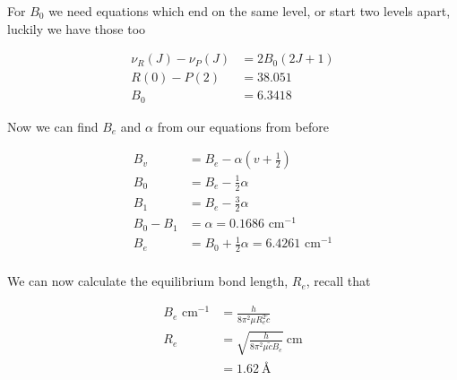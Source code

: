 \documentclass{article}
\newcommand{\mcm}{\text{ cm}^{-1}}
\begin{document}
    For $B_0$ we need equations which end on the same level, or start two levels apart, luckily we have those too

    \begin{align*}
        \nu_R(J) - \nu_P(J) &= 2B_0(2J+1)\\
        R(0)-P(2) &= 38.051\\
        B_0 &= 6.3418
    \end{align*}

    Now we can find $B_e$ and $\alpha$ from our equations from before

    \begin{align*}
        B_v &= B_e - \alpha\left(v+\frac{1}{2}\right)\\
        B_0 &= B_e - \frac{1}{2} \alpha\\
        B_1 &= B_e - \frac{3}{2} \alpha\\
        B_0 - B_1 &= \alpha = 0.1686 \mcm\\
        B_e &= B_0 + \frac{1}{2}\alpha = 6.4261 \mcm\\
    \end{align*}

    We can now calculate the equilibrium bond length, $R_e$, recall that 

    \begin{align*}
        B_e \mcm &= \frac{h}{8\pi^2\mu R_e^2\tilde{c}}\\
        R_e &= \sqrt{\frac{h}{8 \pi^2 \mu \tilde{c}B_e}} \ \text{cm}\\
        &= 1.62 \ \text{\AA}
    \end{align*}
\end{document}
